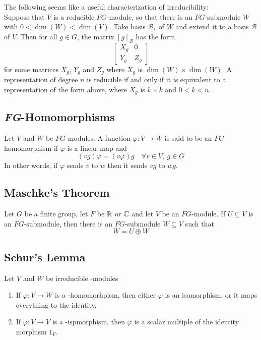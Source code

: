 \documentclass[12pt,twoside]{reedthesis}
\theoremstyle{definition}\newtheorem{definition}{Definition}
\theoremstyle{definition}\newtheorem{example}{Example}
\begin{document}
The following seems like a useful characterization of irreducibility: \\
Suppose that $V$ is a reducible $FG$-module, so that there 
is an $FG$-submodule $W$ with $0 < \dim(W) < \dim(V)$. Take basis $\mathcal{B}_1$ 
of $W$ and extend it to a basis $\mathcal{B}$ of $V$. 
Then for all $g\in G$, the matrix $[g]_\mathcal{B}$ has the form
    \[
        \begin{bmatrix}
            X_g & 0 \\
            Y_g & Z_g
        \end{bmatrix}
    \]  
for some matrices $X_g$, $Y_g$ and $Z_g$ where $X_g$ is $\dim(W) \times \dim(W)$.
 A representation of degree $n$ is reducible if and only if 
 it is equivalent to a representation of the form above,
where $X_g$ is $k \times k$ and $0 < k <n$.
\bigskip

\subsection{\textit{FG}-Homomorphisms}
Let $V$ and $W$ be $FG$-modules. A function $\varphi : V \rightarrow W$ 
is said to be an $FG$-homomorphism if $\varphi$ is a linear map and 
\[
    (vg)\varphi = (v\varphi)g \quad \forall v\in V,\ g\in G
\]
In other words, if $\varphi$ sends $v$ to $w$ then it sends $vg$ to $wg$.

\bigskip

\subsection{Maschke's Theorem}
Let $G$ be a finite group, let $F$ be $\mathbb{R}$ or $\mathbb{C}$ and let $V$ be an $FG$-module. 
If $U \subseteq V$ is an $FG$-submodule, then there is an $FG$-submodule $W \subseteq V$ such that 
\[
    W = U \oplus W
\]

\subsection{Schur's Lemma}
Let $V$ and $W$ be irreducible \CG-modules
\begin{enumerate}[label=(\arabic*), topsep=-3px, itemsep=-3px]
    \item If $\varphi : V \rightarrow W$ is a \CG-homomorhpism, 
    then either $\varphi$ is an isomorphism, or it maps everything to the identity.
    \item If $\varphi : V \rightarrow V$ is a \CG-ispmorphism, 
    then $\varphi$ is a scalar multiple of the identity morphism $1_V$.
\end{enumerate}
\end{document}
